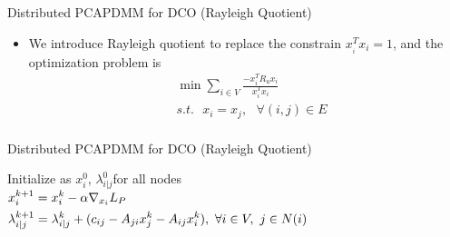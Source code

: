 \documentclass{beamer}
\begin{document}
			
\begin{frame}{Distributed PCA}{PDMM for DCO (Rayleigh Quotient)}
\begin{itemize}
\item{
We introduce Rayleigh quotient to replace the constrain $x_{_{i}}^{T}{{x}_{i}}=1$, and the optimization problem is 
\begin{equation}
\begin{align}
  & \min \sum\limits_{i\in V}{\frac{-x_{i}^{T}{{R}_{u}}{{x}_{i}}}{x_{i}^{T}{{x}_{i}}}} \\ 
 & s.t.\text{     }{{x}_{i}}={{x}_{j}},\text{ }\forall (i,j)\in E \\ 
\end{align}
\end{equation}
}
\end{itemize}
\end{frame}

\begin{frame}{Distributed PCA}{PDMM for DCO (Rayleigh Quotient)}
\begin{algorithm}[H]
			\begin{algorithmic}[1]
			\STATE  Initialize as $ x_{i}^{0} $, $\lambda _{i|j}^{0}$for all nodes		
			\STATE 	$\begin{gathered}
  x_i^{k + 1} = x_i^k - \alpha {\nabla _{{x_i}}}{L_P} \hfill \\
  \lambda _{i|j}^{k + 1} = \lambda _{i|j}^k + ({c_{ij}} - {A_{ji}}x_j^k - {A_{ij}}x_i^k),{\text{ }}\forall i \in V,{\text{ }}j \in N(i) \hfill \\ 
\end{gathered} $		\ENDFOR
			\ENDFOR
			\end{algorithmic}
			\caption{PDMM (Rayleigh Quotient)}
			\label{alg:1}
			\end{algorithm}

\end{frame}
\end{document}
